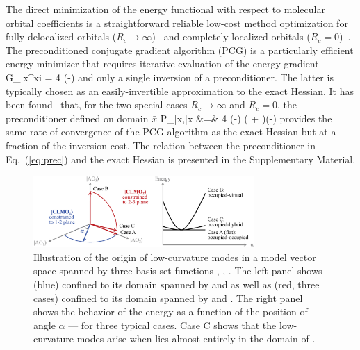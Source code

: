 \documentclass[aps,prl,twocolumn,reprint,amsmath,amssymb]{revtex4-1}
\begin{document}
The direct minimization of the energy functional with respect to molecular orbital coefficients is a straightforward reliable low-cost method optimization for fully delocalized orbitals ($R_c \rightarrow \infty$)~\cite{galli1992large, vandevondele2003efficient, voorhis2002geometric} and completely localized orbitals ($R_c = 0$)~\cite{khaliullin2013efficient}. 
The preconditioned conjugate gradient algorithm (PCG) is a particularly efficient energy minimizer that requires iterative evaluation of the energy gradient
%
\bea \label{eq:grad}
{G_{\bar{x}\mu}}^{xi} \equiv {} = 4  (-)  
\eea
%
and only a single inversion of a preconditioner. The latter is typically chosen as an easily-invertible approximation to the exact Hessian. It has been found~\cite{vandevondele2003efficient,khaliullin2013efficient} that, for the two special cases $R_c \rightarrow \infty$ and $R_c = 0$, the preconditioner defined on domain $\bar{x}$
%
\bea \label{eq:prec}
P_{\bar{x}\mu,\bar{x}\nu} &=& 4  (-) ( + )(-)  
\eea
%
provides the same rate of convergence of the PCG algorithm as the exact Hessian but at a fraction of the inversion cost. The relation between the preconditioner in Eq.~(\ref{eq:prec}) and the exact Hessian is presented in the Supplementary Material. 

\begin{figure}
\centering
\includegraphics[width=0.75\textwidth]{modes}
\caption{Illustration of the origin of low-curvature modes in a model vector space spanned by three basis set functions , , . The left panel shows  (blue) confined to its domain spanned by  and  as well as   (red, three cases) confined to its domain spanned by  and . The right panel shows the behavior of the energy as a function of the position of  --- angle $\alpha$ --- for three typical cases. Case C shows that the low-curvature modes arise when   lies almost entirely in the domain of .}
\label{fig:modes}
\end{figure}
\end{document}
